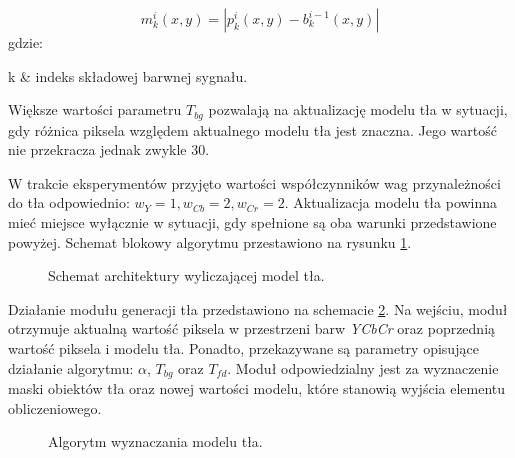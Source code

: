 \begin{enumerate}
	\begin{equation}
	\label{eq:background-model-background-mask-2}
	m^i_k(x,y) = | p^i_k(x,y) - b^{i-1}_k(x,y)|
	\end{equation}
	gdzie:
	\begin{conditions}
		k & indeks składowej barwnej sygnału. \\ %
	\end{conditions}
	
	Większe wartości parametru $T_{bg}$ pozwalają na aktualizację modelu tła w sytuacji, gdy różnica piksela względem aktualnego modelu tła jest znaczna. 
	Jego wartość nie przekracza jednak zwykle $30$.
\end{enumerate}

W trakcie eksperymentów przyjęto wartości współczynników wag przynależności do tła odpowiednio: $w_Y=1, w_{Cb} = 2, w_{Cr} = 2$.
Aktualizacja modelu tła powinna mieć miejsce wyłącznie w sytuacji, gdy spełnione są oba warunki przedstawione powyżej.
Schemat blokowy algorytmu przestawiono na rysunku \ref{fig:background-model}.

\begin{figure}[h]
	\centering
	\def\svgwidth{\textwidth}
	
	\caption{Schemat architektury wyliczającej model tła.}
	\label{fig:background-model}
\end{figure}

Działanie modułu generacji tła przedstawiono na schemacie \ref{fig:background-model-impl}. Na wejściu, moduł otrzymuje aktualną wartość piksela w przestrzeni barw \textit{YCbCr} oraz poprzednią wartość piksela i modelu tła. Ponadto, przekazywane są parametry opisujące działanie algorytmu: $\alpha$, $T_{bg}$ oraz $T_{fd}$. Moduł odpowiedzialny jest za wyznaczenie maski obiektów tła oraz nowej wartości modelu, które stanowią wyjścia elementu obliczeniowego.

\begin{figure}[h]
	\centering
	\def\svgwidth{\textwidth}
	
	\caption{Algorytm wyznaczania modelu tła.}
	\label{fig:background-model-impl}
\end{figure}

